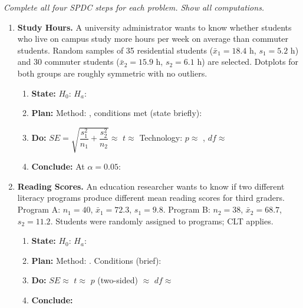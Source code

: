 \documentclass[10pt]{article}
\begin{document}
\namedateperiod

\vspace{0.1in}

\textit{Complete all four SPDC steps for each problem. Show all computations.}

\begin{enumerate}

\item \textbf{Study Hours.} \quad
A university administrator wants to know whether students who live on campus study more
hours per week on average than commuter students. Random samples of 35 residential students
($\bar x_1 = 18.4$ h, $s_1 = 5.2$ h) and 30 commuter students ($\bar x_2 = 15.9$ h,
$s_2 = 6.1$ h) are selected. Dotplots for both groups are roughly symmetric with no outliers.

\begin{enumerate}[label=\alph*.]
  \item \textbf{State:} $H_0$: \blank{4cm} \quad $H_a$: \blank{4cm}
  \item \textbf{Plan:} Method: \blank{5cm}, conditions met (state briefly): \writeline
  \item \textbf{Do:} $SE = \sqrt{\dfrac{s_1^2}{n_1} + \dfrac{s_2^2}{n_2}} \approx$ \blank{2.5cm}
        \quad $t \approx$ \blank{2cm} \quad Technology: $p \approx$ \blank{2cm}, $df \approx$ \blank{2cm}
  \item \textbf{Conclude:} At $\alpha = 0.05$: 
\end{enumerate}

\vspace{0.05in}

\item \textbf{Reading Scores.} \quad
An education researcher wants to know if two different literacy programs produce different
mean reading scores for third graders. Program A: $n_1 = 40$, $\bar x_1 = 72.3$, $s_1 = 9.8$.
Program B: $n_2 = 38$, $\bar x_2 = 68.7$, $s_2 = 11.2$. Students were randomly assigned
to programs; CLT applies.

\begin{enumerate}[label=\alph*.]
  \item \textbf{State:} $H_0$: \blank{4cm} \quad $H_a$: \blank{4cm}
  \item \textbf{Plan:} Method: \blank{5cm}. Conditions (brief): \writeline
  \item \textbf{Do:} $SE \approx$ \blank{2.5cm} \quad $t \approx$ \blank{2cm}
        \quad $p$ (two-sided) $\approx$ \blank{2cm} \quad $df \approx$ \blank{2cm}
  \item \textbf{Conclude:} 
\end{enumerate}


\end{enumerate}
\end{document}
